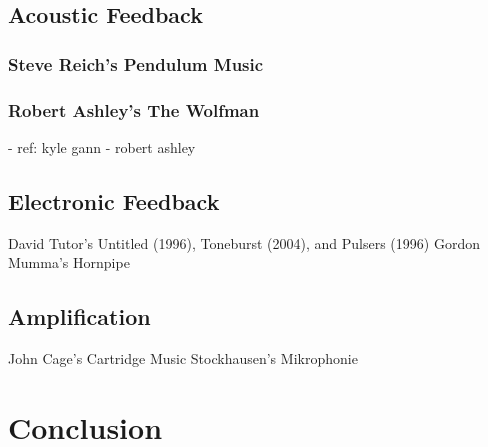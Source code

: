 \documentclass[titlepage]{scrartcl}
\begin{document}
    \subsection{Acoustic Feedback}
    \subsubsection{Steve Reich's Pendulum Music}\label{pendulum}
    \subsubsection{Robert Ashley's The Wolfman}\label{wolfman}
    - ref: kyle gann - robert ashley

    \subsection{Electronic Feedback}\label{ElecFeed}
        David Tutor's Untitled (1996), Toneburst (2004), and Pulsers (1996)
        Gordon Mumma's Hornpipe

    \subsection{Amplification}
        John Cage's Cartridge Music
        Stockhausen's Mikrophonie

    \section{Conclusion}

    \printbibliography
\end{document}

